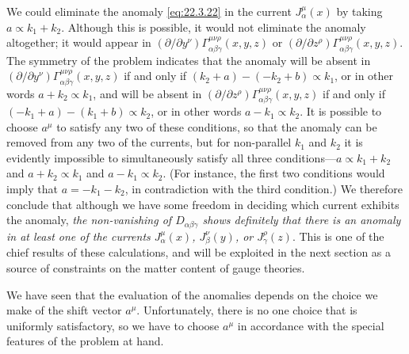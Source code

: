 We could eliminate the anomaly \eqref{eq:22.3.22} in the current
$J_\alpha^\mu(x)$ by taking $a\propto k_1+k_2$. Although this is possible,
it would not eliminate the anomaly altogether; it would appear in
$(\partial/\partial y^\nu)\Gamma_{\alpha\beta\gamma}^{\mu\nu\rho}(x,y,z)$
or
$(\partial/\partial z^\rho)\Gamma_{\alpha\beta\gamma}^{\mu\nu\rho}(x,y,z)$.
The symmetry of the problem indicates that the anomaly will be absent in
$(\partial/\partial y^\nu)\Gamma_{\alpha\beta\gamma}^{\mu\nu\rho}(x,y,z)$
if and only if $(k_2+a)-(-k_2+b)\propto k_1$, or in other words
$a+k_2\propto k_1$, and will be absent in
$(\partial/\partial z^\rho)\Gamma_{\alpha\beta\gamma}^{\mu\nu\rho}(x,y,z)$
if and only if $(-k_1+a)-(k_1+b)\propto k_2$, or in other words
$a-k_1\propto k_2$. It is possible to choose $a^\mu$ to satisfy any two of
these conditions, so that the anomaly can be removed from any two of the
currents, but for non-parallel $k_1$ and $k_2$ it is evidently impossible
to simultaneously satisfy all three conditions---$a\propto k_1+k_2$ and
$a+k_2\propto k_1$ and $a-k_1\propto k_2$. (For instance, the first two
conditions would imply that $a=-k_1-k_2$, in contradiction with the third
condition.) We therefore conclude that although we have some freedom in
deciding which current exhibits the anomaly, \emph{the non-vanishing of
$D_{\alpha\beta\gamma}$ shows definitely that there is an anomaly in at
least one of the currents $J_\alpha^\mu(x)$, $J_\beta^\nu(y)$, or
$J_\gamma^\rho(z)$}. This is one of the chief results of these
calculations, and will be exploited in the next section as a source of
constraints on the matter content of gauge theories.

We have seen that the evaluation of the anomalies depends on the choice we
make of the shift vector $a^\mu$. Unfortunately, there is no one choice
that is uniformly satisfactory, so we have to choose $a^\mu$ in accordance
with the special features of the problem at hand.

